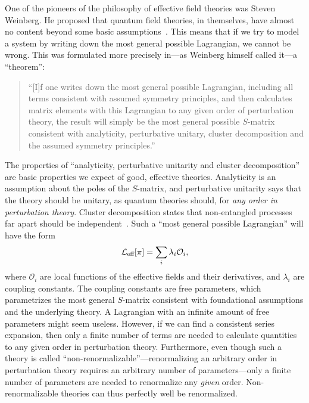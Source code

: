 One of the pioneers of the philosophy of effective field theories was Steven Weinberg.
He proposed that quantum field theories, in themselves, have almost no content beyond some basic assumptions~\autocite{weinbergDevelopmentEffectiveField2021}.
This means that if we try to model a system by writing down the most general possible Lagrangian, we cannot be wrong.
This was formulated more precisely in---as Weinberg himself called it---a ``theorem'':
%
\begin{quote}
    ``[I]f one writes down the most general possible Lagrangian, including all terms consistent with assumed symmetry principles, and then calculates matrix elements with this Lagrangian to any given order of perturbation theory, the result will simply be the most general possible $S$-matrix consistent with analyticity, perturbative unitary, cluster decomposition and the assumed symmetry principles.''~\autocite{weinbergPhenomenologicalLagrangians1979}
\end{quote}
%
The properties of ``analyticity, perturbative unitarity and cluster decomposition'' are basic properties we expect of good, effective theories.
Analyticity is an assumption about the poles of the $S$-matrix, and perturbative unitarity says that the theory should be unitary, as quantum theories should, for \emph{any order in perturbation theory}.
Cluster decomposition states that non-entangled processes far apart should be independent~\autocite{weinbergQuantumTheoryFields1995,weinbergQuantumTheoryFields1996}.
Such a ``most general possible Lagrangian'' will have the form
\begin{equation}
    \mathcal{L}_\text{eff}[\pi] = \sum_i \lambda_i \mathcal O_i,
\end{equation}
where $\mathcal O_i$ are local functions of the effective fields and their derivatives, and $\lambda_i$ are coupling constants.
The coupling constants are free parameters, which parametrizes the most general $S$-matrix consistent with foundational assumptions and the underlying theory.
A Lagrangian with an infinite amount of free parameters might seem useless.
However, if we can find a consistent series expansion, then only a finite number of terms are needed to calculate quantities to any given order in perturbation theory.
Furthermore, even though such a theory is called ``non-renormalizable''---renormalizing an arbitrary order in perturbation theory requires an arbitrary number of parameters---only a finite number of parameters are needed to renormalize any \emph{given} order.
Non-renormalizable theories can thus perfectly well be renormalized.

